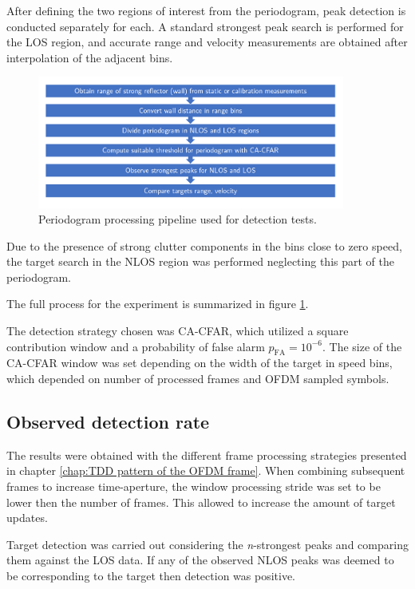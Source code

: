 After defining the two regions of interest from the periodogram, peak detection is conducted separately for each. A standard strongest peak search is performed for the LOS region, and accurate range and velocity measurements are obtained after interpolation of the adjacent bins.

\begin{figure}[H]
	\centering
	\includegraphics[width=0.9\textwidth]{Images/Test1/NLOS-proc-pipeline.png}
	\caption{Periodogram processing pipeline used for detection tests.}
	\label{fig:Test1_NLOS-proc-pipeline}
\end{figure}


Due to the presence of strong clutter components in the bins close to zero speed, the target search in the NLOS region was performed neglecting this part of the periodogram.

The full process for the experiment is summarized in figure \ref{fig:Test1_NLOS-proc-pipeline}.

The detection strategy chosen was CA-CFAR, which utilized a square contribution window and a probability of false alarm $p_{\text{FA}} = 10^{-6}$. The size of the CA-CFAR window was set depending on the width of the target in speed bins, which depended on number of processed frames and OFDM sampled symbols.  

\subsection{Observed detection rate}

The results were obtained with the different frame processing strategies presented in chapter \ref{chap:TDD pattern of the OFDM frame}. When combining subsequent frames to increase time-aperture, the window processing stride was set to be lower then the number of frames. This allowed to increase the amount of target updates.

Target detection was carried out considering the \textit{n}-strongest peaks and comparing them against the LOS data. If any of the observed NLOS peaks was deemed to be corresponding to the target then detection was positive.

